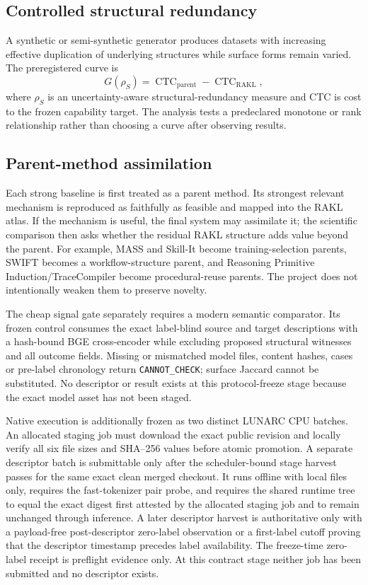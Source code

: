 \subsection{Controlled structural redundancy}

A synthetic or semi-synthetic generator produces datasets with increasing effective duplication of underlying structures while surface forms remain varied. The preregistered curve is
\[
G(\rho_S)=\operatorname{CTC}_{\mathrm{parent}}-\operatorname{CTC}_{\mathrm{RAKL}},
\]
where $\rho_S$ is an uncertainty-aware structural-redundancy measure and CTC is cost to the frozen capability target. The analysis tests a predeclared monotone or rank relationship rather than choosing a curve after observing results.

\subsection{Parent-method assimilation}

Each strong baseline is first treated as a parent method. Its strongest relevant mechanism is reproduced as faithfully as feasible and mapped into the RAKL atlas. If the mechanism is useful, the final system may assimilate it; the scientific comparison then asks whether the residual RAKL structure adds value beyond the parent. For example, MASS and Skill-It become training-selection parents, SWIFT becomes a workflow-structure parent, and Reasoning Primitive Induction/TraceCompiler become procedural-reuse parents. The project does not intentionally weaken them to preserve novelty.

The cheap signal gate separately requires a modern semantic comparator.  Its frozen control consumes the exact label-blind source and target descriptions with a hash-bound BGE cross-encoder while excluding proposed structural witnesses and all outcome fields. Missing or mismatched model files, content hashes, cases or pre-label chronology return \texttt{CANNOT\_CHECK}; surface Jaccard cannot be substituted. No descriptor or result exists at this protocol-freeze stage because the exact model asset has not been staged.

Native execution is additionally frozen as two distinct LUNARC CPU batches. An
allocated staging job must download the exact public revision and locally verify
all six file sizes and SHA--256 values before atomic promotion. A separate
descriptor batch is submittable only after the scheduler-bound stage harvest
passes for the same exact clean merged checkout. It runs offline with local
files only, requires the fast-tokenizer pair probe, and requires the shared
runtime tree to equal the exact digest first attested by the allocated staging
job and to remain unchanged through inference. A later descriptor harvest is
authoritative only with a payload-free post-descriptor zero-label observation or
a first-label cutoff proving that the descriptor timestamp precedes label
availability. The freeze-time zero-label receipt is preflight evidence only. At
this contract stage neither job has been submitted and no descriptor exists.

